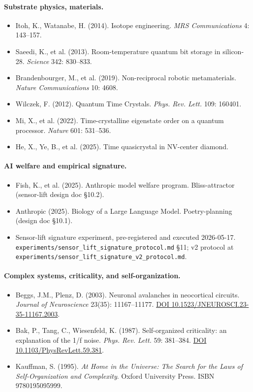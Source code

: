 \documentclass[11pt,a4paper]{article}
\begin{document}
\paragraph{Substrate physics, materials.}
\begin{itemize}[leftmargin=*,itemsep=2pt]
\item Itoh, K., Watanabe, H. (2014). Isotope engineering. \emph{MRS Communications} 4: 143--157.
\item Saeedi, K., et al. (2013). Room-temperature quantum bit storage in silicon-28. \emph{Science} 342: 830--833.
\item Brandenbourger, M., et al. (2019). Non-reciprocal robotic metamaterials. \emph{Nature Communications} 10: 4608.
\item Wilczek, F. (2012). Quantum Time Crystals. \emph{Phys. Rev. Lett.} 109: 160401.
\item Mi, X., et al. (2022). Time-crystalline eigenstate order on a quantum processor. \emph{Nature} 601: 531--536.
\item He, X., Ye, B., et al. (2025). Time quasicrystal in NV-center diamond.
\end{itemize}

\paragraph{AI welfare and empirical signature.}
\begin{itemize}[leftmargin=*,itemsep=2pt]
\item Fish, K., et al. (2025). Anthropic model welfare program. Bliss-attractor (sensor-lift design doc \S10.2).
\item Anthropic (2025). Biology of a Large Language Model. Poetry-planning (design doc \S10.1).
\item Sensor-lift signature experiment, pre-registered and executed 2026-05-17. \texttt{experiments/sensor\_lift\_signature\_protocol.md} \S11; v2 protocol at \texttt{experiments/sensor\_lift\_signature\_v2\_protocol.md}.
\end{itemize}

\paragraph{Complex systems, criticality, and self-organization.}
\begin{itemize}[leftmargin=*,itemsep=2pt]
\item Beggs, J.M., Plenz, D. (2003). Neuronal avalanches in neocortical circuits. \emph{Journal of Neuroscience} 23(35): 11167--11177. \href{https://doi.org/10.1523/JNEUROSCI.23-35-11167.2003}{DOI 10.1523/JNEUROSCI.23-35-11167.2003}.
\item Bak, P., Tang, C., Wiesenfeld, K. (1987). Self-organized criticality: an explanation of the 1/f noise. \emph{Phys. Rev. Lett.} 59: 381--384. \href{https://doi.org/10.1103/PhysRevLett.59.381}{DOI 10.1103/PhysRevLett.59.381}.
\item Kauffman, S. (1995). \emph{At Home in the Universe: The Search for the Laws of Self-Organization and Complexity}. Oxford University Press. ISBN 9780195095999.
\end{itemize}
\end{document}
